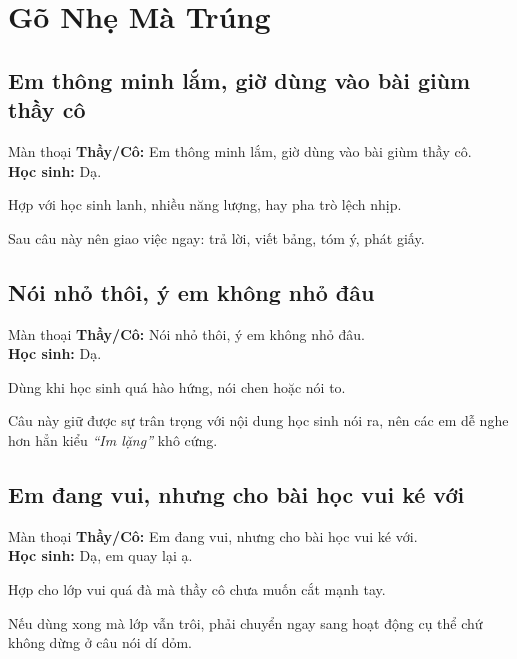 \chapter{Gõ Nhẹ Mà Trúng}

\section{Em thông minh lắm, giờ dùng vào bài giùm thầy cô}
\begin{manthoai}{Màn thoại}
\textbf{Thầy/Cô:} Em thông minh lắm, giờ dùng vào bài giùm thầy cô.\\
\textbf{Học sinh:} Dạ.
\end{manthoai}
\begin{dungkhinào}
Hợp với học sinh lanh, nhiều năng lượng, hay pha trò lệch nhịp.
\end{dungkhinào}
\begin{nhipthem}
Sau câu này nên giao việc ngay: trả lời, viết bảng, tóm ý, phát giấy.
\end{nhipthem}
\ngancach

\section{Nói nhỏ thôi, ý em không nhỏ đâu}
\begin{manthoai}{Màn thoại}
\textbf{Thầy/Cô:} Nói nhỏ thôi, ý em không nhỏ đâu.\\
\textbf{Học sinh:} Dạ.
\end{manthoai}
\begin{dungkhinào}
Dùng khi học sinh quá hào hứng, nói chen hoặc nói to.
\end{dungkhinào}
\begin{nhipthem}
Câu này giữ được sự trân trọng với nội dung học sinh nói ra, nên các em dễ nghe hơn hẳn kiểu \textit{``Im lặng''} khô cứng.
\end{nhipthem}
\ngancach

\section{Em đang vui, nhưng cho bài học vui ké với}
\begin{manthoai}{Màn thoại}
\textbf{Thầy/Cô:} Em đang vui, nhưng cho bài học vui ké với.\\
\textbf{Học sinh:} Dạ, em quay lại ạ.
\end{manthoai}
\begin{dungkhinào}
Hợp cho lớp vui quá đà mà thầy cô chưa muốn cắt mạnh tay.
\end{dungkhinào}
\begin{nhipthem}
Nếu dùng xong mà lớp vẫn trôi, phải chuyển ngay sang hoạt động cụ thể chứ không dừng ở câu nói dí dỏm.
\end{nhipthem}
\ngancach

